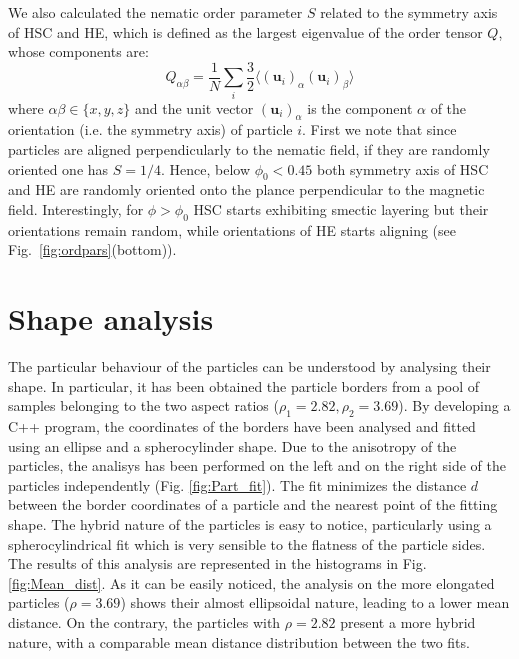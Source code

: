 \documentclass{article}
\begin{document}
We also calculated the nematic order parameter $S$ related to the symmetry axis of HSC and HE, which
is defined as the largest eigenvalue of the order tensor $Q$, whose components are:
\begin{equation}
Q_{\alpha\beta} = \frac{1}{N} \sum_i \frac{3}{2} \langle (\mathbf{u}_i)_\alpha (\mathbf{u}_i)_\beta\rangle
\label{eq:nemop}
\end{equation}
where $\alpha\beta\in\{x,y,z\}$ and the unit vector $(\mathbf{u}_i)_\alpha$ is the component $\alpha$ of the orientation (i.e. the symmetry axis) of particle $i$.
First we note that since particles are aligned perpendicularly to the nematic field, if they are 
randomly oriented one has $S=1/4$. Hence, below $\phi_0 < 0.45$ both symmetry axis of HSC and HE are 
randomly oriented onto the plance perpendicular to the magnetic field.
Interestingly, for $\phi > \phi_0$ HSC starts exhibiting smectic layering but their orientations
remain random, while orientations of HE starts aligning (see Fig.~\ref{fig:ordpars}(bottom)).

\section{Shape analysis}

The particular behaviour of the particles can be understood by analysing their shape. In particular, it has been obtained the particle borders from a pool of samples belonging to the two aspect ratios ($\rho_1 = 2.82, \rho_2 = 3.69$). By developing a C++ program, the coordinates of the borders have been analysed and fitted using an ellipse and a spherocylinder shape. Due to the anisotropy of the particles, the analisys has been performed on the left and on the right side of the particles independently (Fig. \ref{fig:Part_fit}). The fit minimizes the distance $d$ between the border coordinates of a particle and the nearest point of the fitting shape. The hybrid nature of the particles is easy to notice, particularly using a spherocylindrical fit which is very sensible to the flatness of the particle sides. The results of this analysis are represented in the histograms in Fig. \ref{fig:Mean_dist}. As it can be easily noticed, the analysis on the more elongated particles ($\rho = 3.69$) shows their almost ellipsoidal nature, leading to a lower mean distance. On the contrary, the particles with $\rho = 2.82$ present a more hybrid nature, with a comparable mean distance distribution between the two fits.
\end{document}
